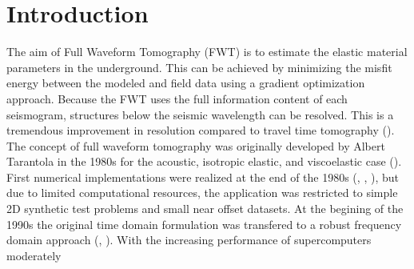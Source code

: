 


\chapter{Introduction}


The aim of Full Waveform Tomography (FWT) is to estimate the elastic material parameters in the underground. This can be achieved by minimizing the misfit energy 
between the modeled and field data using a gradient optimization approach. Because the FWT uses the full information content of each seismogram, structures below the seismic 
wavelength can be resolved. This is a tremendous improvement in resolution compared to travel time tomography (\cite{prattgao:2002}).\\ 
The concept of full waveform tomography was originally developed by Albert Tarantola in the  1980s  for the acoustic, isotropic elastic, and 
viscoelastic case (\cite{tarantola:84a,tarantola:84,tarantola:86,tarantola:88}). First numerical implementations were realized at the end of the 1980s 
(\cite{gauthier:86}, \cite{mora:87}, \cite{pica:90}), but due to limited computational resources, the application was restricted to simple 
2D synthetic test problems and small near offset datasets. At the begining of the 1990s the original time domain formulation was transfered 
to a robust frequency domain approach (\cite{prattworth:90}, \cite{pratt:90}). With the increasing performance of supercomputers moderately 
